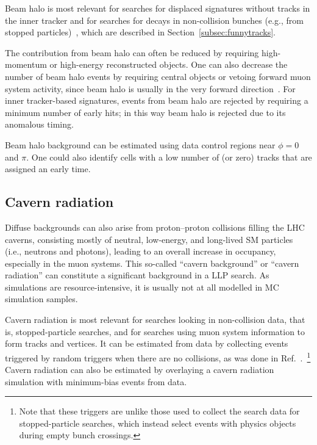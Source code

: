 Beam halo is most relevant for searches for displaced signatures without tracks in the inner tracker and for searches for decays in non-collision bunches (e.g., from stopped particles)~\cite{Khachatryan:2015jha, Chatrchyan:2012dxa, Khachatryan:2010uf}, which are described in Section~\ref{subsec:funnytracks}.

The contribution from beam halo can often be reduced by requiring high-momentum or high-energy reconstructed objects. One can also decrease the number of beam halo events by requiring central objects or vetoing forward muon system activity, since beam halo is usually in the very forward direction~\cite{Khachatryan:2015jha, Chatrchyan:2012dxa, Khachatryan:2010uf}. For inner tracker-based signatures, events from beam halo are rejected by requiring a minimum number of early hits; in this way beam halo is rejected due to its anomalous timing.

Beam halo background can be estimated using data control regions near $\phi=0$ and $\pi$. One could also identify cells with a low number of (or zero) tracks that are assigned an early time. %

\subsection{Cavern radiation} %

Diffuse backgrounds can also arise from proton--proton collisions filling the LHC caverns, consisting mostly of neutral, low-energy, and long-lived SM particles (i.e., neutrons and photons), leading to an overall increase in occupancy, especially in the muon systems. This so-called ``cavern background'' or ``cavern radiation'' can constitute a significant background in a LLP search. As simulations are resource-intensive, it is usually not at all modelled in MC simulation samples.

Cavern radiation is most relevant for searches looking in non-collision data, that is, stopped-particle searches, and for searches using muon system information to form tracks and vertices. It can be estimated from data by collecting events triggered by random triggers when there are no collisions, as was done in Ref.~\cite{Aad:2013gva}.~\footnote{Note that these triggers are unlike those used to collect the search data for stopped-particle searches, which instead select events with physics objects during empty bunch crossings.} Cavern radiation can also be estimated by overlaying a cavern radiation simulation with minimum-bias events from data.

